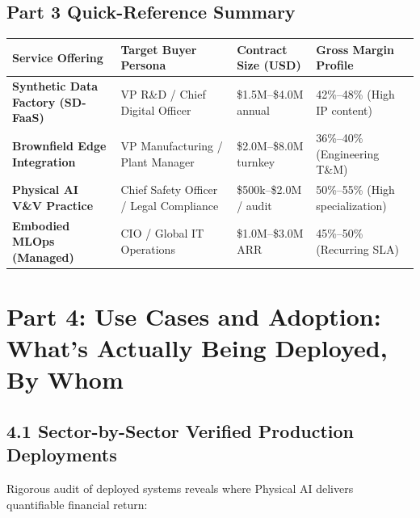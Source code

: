 \documentclass[11pt,a4paper]{article}
\begin{document}
\subsection*{Part 3 Quick-Reference Summary}
\begin{table}[h!]
\centering
\scriptsize
\begin{tabularx}{\textwidth}{@{}l X X X@{}}
\toprule
\textbf{Service Offering} & \textbf{Target Buyer Persona} & \textbf{Contract Size (USD)} & \textbf{Gross Margin Profile} \\
\midrule
\textbf{Synthetic Data Factory (SD-FaaS)} & VP R\&D / Chief Digital Officer & \$1.5M--\$4.0M annual & 42\%--48\% (High IP content) \\
\textbf{Brownfield Edge Integration} & VP Manufacturing / Plant Manager & \$2.0M--\$8.0M turnkey & 36\%--40\% (Engineering T\&M) \\
\textbf{Physical AI V\&V Practice} & Chief Safety Officer / Legal Compliance & \$500k--\$2.0M / audit & 50\%--55\% (High specialization) \\
\textbf{Embodied MLOps (Managed)} & CIO / Global IT Operations & \$1.0M--\$3.0M ARR & 45\%--50\% (Recurring SLA) \\
\bottomrule
\end{tabularx}
\end{table}

\section{Part 4: Use Cases and Adoption: What's Actually Being Deployed, By Whom}

\subsection{4.1 Sector-by-Sector Verified Production Deployments}
Rigorous audit of deployed systems reveals where Physical AI delivers quantifiable financial return:
\end{document}
